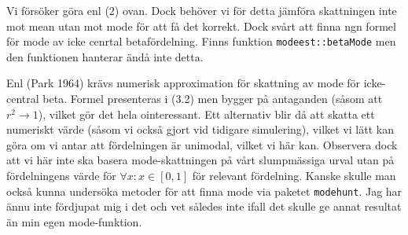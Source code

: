 \documentclass[]{article}
\begin{document}
Vi försöker göra enl (2) ovan. Dock behöver vi för detta jämföra
skattningen inte mot mean utan mot mode för att få det korrekt. Dock
svårt att finna ngn formel för mode av icke cenrtal betafördelning.
Finns funktion \texttt{modeest::betaMode} men den funktionen hanterar
ändå inte detta.

Enl (Park 1964) krävs numerisk approximation för skattning av mode för
icke-central beta. Formel presenteras i (3.2) men bygger på antaganden
(såsom att \(r^2 \rightarrow 1\)), vilket gör det hela ointeressant. Ett
alternativ blir då att skatta ett numeriskt värde (såsom vi också gjort
vid tidigare simulering), vilket vi lätt kan göra om vi antar att
fördelningen är unimodal, vilket vi här kan. Observera dock att vi här
inte ska basera mode-skattningen på vårt slumpmässiga urval utan på
fördelningens värde för \(\forall x: x \in [0,1]\) för relevant
fördelning. Kanske skulle man också kunna undersöka metoder för att
finna mode via paketet \texttt{modehunt}. Jag har ännu inte fördjupat
mig i det och vet således inte ifall det skulle ge annat resultat än min
egen mode-funktion.
\end{document}
